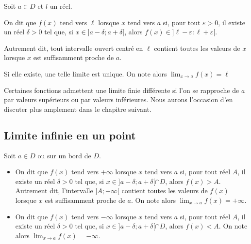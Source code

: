 \documentclass[11pt,fleqn, openany]{book} %
\begin{document}
\begin{definition}Soit $a \in D$ et $l$ un réel.

On dit que $f(x)$ tend vers $\ell$ lorsque $x$ tend vers $a$  si, pour tout $\varepsilon>0$, il existe un réel $\delta >0$ tel que, si $x\in ]a - \delta ; a+\delta[$, alors $f(x) \in ]\ell-\varepsilon : \ell+ \varepsilon [$.

Autrement dit, tout intervalle ouvert centré en $\ell$ contient toutes les valeurs de $x$ lorsque $x$ est suffisamment proche de $a$.

Si elle existe, une telle limite est unique. On note alors $\displaystyle \lim_{x \to a} f(x) =\ell $\end{definition}

Certaines fonctions admettent une limite finie différente si l'on se rapproche de $a$ par valeurs supérieurs ou par valeurs inférieures. Nous aurons l'occasion d'en discuter plus amplement dans le chapitre suivant.

\subsection{Limite infinie en un point}

\begin{definition}Soit $a \in D$ ou sur un bord de $D$.
\begin{itemize}
\item On dit que $f(x)$ tend vers $+\infty$ lorsque $x$ tend vers $a$  si, pour tout réel $A$, il existe un réel $\delta >0$ tel que, si $x\in ]a - \delta ; a+\delta[\cap D$, alors $f(x) > A$. Autrement dit, l'intervalle $]A;+\infty[$ contient toutes les valeurs de $f(x)$ lorsque $x$ est suffisamment proche de $a$. On note alors $\displaystyle \lim_{x \to a} f(x) =+\infty $.
\item On dit que $f(x)$ tend vers $-\infty$ lorsque $x$ tend vers $a$  si, pour tout réel $A$, il existe un réel $\delta >0$ tel que, si $x\in ]a - \delta ; a+\delta[\cap D$, alors $f(x) < A$. On note alors $\displaystyle \lim_{x \to a} f(x) =-\infty $.
\end{itemize}
\end{definition}
\end{document}

